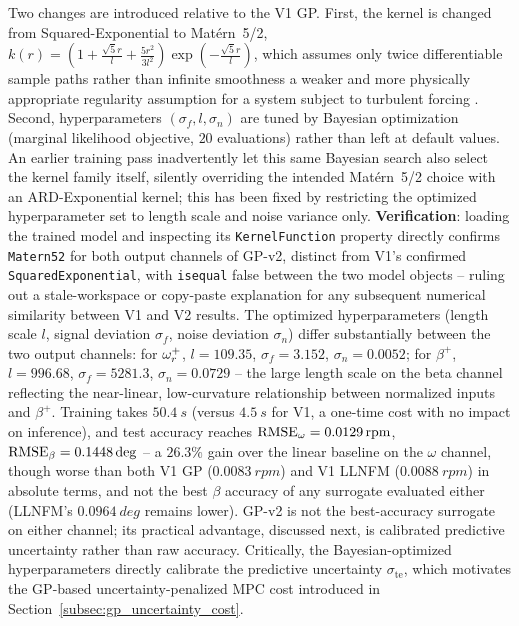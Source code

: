 Two changes are introduced relative to the V1 GP. First, the kernel is
changed from Squared-Exponential to Matérn~5/2,
$k(r) = \left(1 + \tfrac{\sqrt{5}r}{l} + \tfrac{5r^2}{3l^2}\right)
\exp\!\left(-\tfrac{\sqrt{5}r}{l}\right)$, which assumes only twice
differentiable sample paths rather than infinite smoothness  a weaker and
more physically appropriate regularity assumption for a system subject to
turbulent forcing \citep{rasmussen2006}. Second, hyperparameters
$(\sigma_f, l, \sigma_n)$ are tuned by Bayesian optimization (marginal
likelihood objective, $20$ evaluations) rather than left at default values.
An earlier training pass inadvertently let this same Bayesian search
also select the kernel family itself, silently overriding the intended
Mat\'ern~5/2 choice with an ARD-Exponential kernel; this has been
fixed by restricting the optimized hyperparameter set to length scale
and noise variance only. \textbf{Verification}: loading the trained
model and inspecting its \texttt{KernelFunction} property directly
confirms \texttt{Matern52} for both output channels of GP-v2, distinct
from V1's confirmed \texttt{SquaredExponential}, with
\texttt{isequal} false between the two model objects -- ruling out a
stale-workspace or copy-paste explanation for any subsequent numerical
similarity between V1 and V2 results. The optimized hyperparameters
(length scale $l$, signal deviation $\sigma_f$, noise deviation
$\sigma_n$) differ substantially between the two output channels: for
$\omega_r^{+}$, $l=109.35$, $\sigma_f=3.152$, $\sigma_n=0.0052$; for
$\beta^{+}$, $l=996.68$, $\sigma_f=5281.3$, $\sigma_n=0.0729$ -- the
large length scale on the beta channel reflecting the near-linear,
low-curvature relationship between normalized
inputs and $\beta^{+}$. Training takes $\SI{50.4}{s}$ (versus
$\SI{4.5}{s}$ for V1, a one-time cost with no impact on inference), and
test accuracy reaches $\text{RMSE}_{\omega}=\SI{0.0129}{rpm}$,
$\text{RMSE}_{\beta}=0.1448\deg$ -- a $26.3\%$ gain over the linear baseline
on the $\omega$ channel, though worse than both V1 GP
($\SI{0.0083}{rpm}$) and V1 LLNFM ($\SI{0.0088}{rpm}$) in absolute
terms, and not the best $\beta$ accuracy of any surrogate evaluated
either (LLNFM's $\SI{0.0964}{deg}$ remains lower). GP-v2 is not the
best-accuracy surrogate on either channel; its practical advantage,
discussed next, is calibrated predictive uncertainty rather than
raw accuracy. Critically,
the Bayesian-optimized hyperparameters directly calibrate the predictive
uncertainty $\sigma_{\text{te}}$, which motivates the GP-based
uncertainty-penalized MPC cost introduced in
Section~\ref{subsec:gp_uncertainty_cost}.

